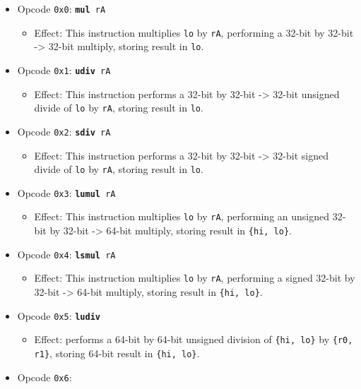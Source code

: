 \documentclass{article}
\begin{document}
	\singlespacing
	\begin{itemize}
		\item Opcode \texttt{0x0}:
			\texttt{\textbf{mul} rA}
		\begin{itemize}
			\item Effect:  This instruction multiplies \texttt{lo} by
			\texttt{rA}, performing a 32-bit by 32-bit -> 32-bit multiply,
			storing result in \texttt{lo}.
		\end{itemize}
		\item Opcode \texttt{0x1}:
			\texttt{\textbf{udiv} rA}
		\begin{itemize}
			\item Effect:  This instruction performs a 32-bit by 32-bit ->
			32-bit unsigned divide of \texttt{lo} by \texttt{rA}, storing
			result in \texttt{lo}.
		\end{itemize}
		\item Opcode \texttt{0x2}:
			\texttt{\textbf{sdiv} rA}
		\begin{itemize}
			\item Effect:  This instruction performs a 32-bit by 32-bit ->
			32-bit signed divide of \texttt{lo} by \texttt{rA}, storing
			result in \texttt{lo}.
		\end{itemize}
		\item Opcode \texttt{0x3}:
			\texttt{\textbf{lumul} rA}
		\begin{itemize}
			\item Effect:  This instruction multiplies \texttt{lo} by
			\texttt{rA}, performing an unsigned 32-bit by 32-bit -> 64-bit
			multiply, storing result in \texttt{\{hi, lo\}}.
		\end{itemize}
		\item Opcode \texttt{0x4}:
			\texttt{\textbf{lsmul} rA}
		\begin{itemize}
			\item Effect:  This instruction multiplies \texttt{lo} by
			\texttt{rA}, performing a signed 32-bit by 32-bit -> 64-bit
			multiply, storing result in \texttt{\{hi, lo\}}.
		\end{itemize}
		\item Opcode \texttt{0x5}:
			\texttt{\textbf{ludiv}}
		\begin{itemize}
			\item Effect:  performs a 64-bit by 64-bit unsigned division of
			\texttt{\{hi, lo\}} by \texttt{\{r0, r1\}}, storing 64-bit
			result in \texttt{\{hi, lo\}}.
		\end{itemize}
		\item Opcode \texttt{0x6}:

\end{itemize}
\end{document}
